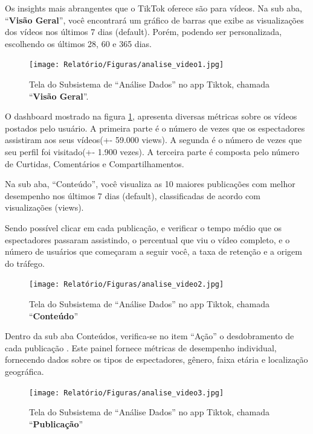 Os insights mais abrangentes que o TikTok oferece são para vídeos. Na sub aba, “\textbf{Visão Geral}”, você encontrará um gráfico de barras que exibe as visualizações dos vídeos nos últimos 7 dias (default). Porém, podendo ser personalizada, escolhendo os últimos 28, 60 e 365 dias.


\begin{figure}[H]
    \centering
    \texttt{[image: Relatório/Figuras/analise\_video1.jpg]}
    \caption{Tela do Subsistema de “Análise Dados” no app Tiktok, chamada “\textbf{Visão Geral}”.}
    \label{fig:enter-label2} 
\end{figure}

O dashboard mostrado na figura \ref{fig:enter-label2}, apresenta diversas métricas sobre os vídeos postados pelo usuário. A primeira parte é o número de vezes que os espectadores assistiram aos seus vídeos(+- 59.000 views). A segunda é o número de vezes que seu perfil foi visitado(+- 1.900 vezes). A terceira parte é composta pelo número de Curtidas, Comentários e Compartilhamentos.

\newpage
Na sub aba, “Conteúdo”, você visualiza as 10 maiores publicações com melhor desempenho nos últimos 7 dias (default), classificadas de acordo com visualizações (views).\vskip0.3cm

Sendo possível clicar em cada publicação, e verificar o tempo médio que os espectadores passaram assistindo, o percentual que viu o vídeo completo, e o número de usuários que começaram a seguir você, a taxa de retenção e a origem do tráfego.



\begin{figure}[H]
    \centering
    \texttt{[image: Relatório/Figuras/analise\_video2.jpg]}
    \caption{Tela do Subsistema de “Análise Dados” no app Tiktok, chamada “\textbf{Conteúdo}”}
    \label{fig:enter-label} 
\end{figure}

Dentro da sub aba Conteúdos, verifica-se no item “Ação” o desdobramento de cada publicação . Este painel fornece métricas de desempenho individual, fornecendo dados sobre os tipos de espectadores, gênero, faixa etária e localização geográfica.

\begin{figure}[H]
    \centering
    \texttt{[image: Relatório/Figuras/analise\_video3.jpg]}
    \caption{Tela do Subsistema de “Análise Dados” no app Tiktok, chamada “\textbf{Publicação}”}
    \label{fig:enter-label} 
\end{figure}





